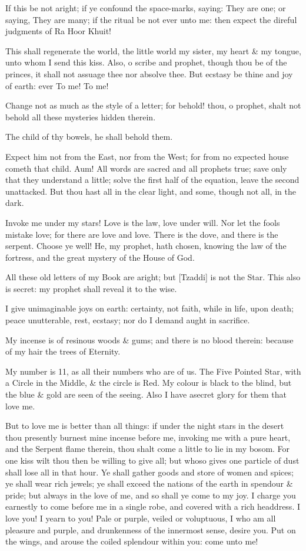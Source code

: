 If this be not aright; if ye confound the space-marks, saying: They are one; or saying, They are many; if the ritual be not ever unto me: then expect the direful judgments of Ra Hoor Khuit!

This shall regenerate the world, the little world my sister, my heart & my tongue, unto whom I send this kiss. Also, o scribe and prophet, though thou be of the princes, it shall not assuage thee nor absolve thee. But ecstasy be thine and joy of earth: ever To me! To me!

Change not as much as the style of a letter; for behold! thou, o prophet, shalt not behold all these mysteries hidden therein.

The child of thy bowels, he shall behold them.

Expect him not from the East, nor from the West; for from no expected house cometh that child. Aum! All words are sacred and all prophets true; save only that they understand a little; solve the first half of the equation, leave the second unattacked. But thou hast all in the clear light, and some, though not all, in the dark.

Invoke me under my stars! Love is the law, love under will. Nor let the fools mistake love; for there are love and love. There is the dove, and there is the serpent. Choose ye well! He, my prophet, hath chosen, knowing the law of the fortress, and the great mystery of the House of God.\par
All these old letters of my Book are aright; but [Tzaddi] is not the Star. This also is secret: my prophet shall reveal it to the wise.

I give unimaginable joys on earth: certainty, not faith, while in life, upon death; peace unutterable, rest, ecstasy; nor do I demand aught in sacrifice.

My incense is of resinous woods & gums; and there is no blood therein: because of my hair the trees of Eternity.

My number is 11, as all their numbers who are of us. The Five Pointed Star, with a Circle in the Middle, & the circle is Red. My colour is black to the blind, but the blue & gold are seen of the seeing. Also I have asecret glory for them that love me.

But to love me is better than all things: if under the night stars in the desert thou presently burnest mine incense before me, invoking me with a pure heart, and the Serpent flame therein, thou shalt come a little to lie in my bosom. For one kiss wilt thou then be willing to give all; but whoso gives one particle of dust shall lose all in that hour. Ye shall gather goods and store of women and spices; ye shall wear rich jewels; ye shall exceed the nations of the earth in spendour & pride; but always in the love of me, and so shall ye come to my joy. I charge you earnestly to come before me in a single robe, and covered with a rich headdress. I love you! I yearn to you! Pale or purple, veiled or voluptuous, I who am all pleasure and purple, and drunkenness of the innermost sense, desire you. Put on the wings, and arouse the coiled splendour within you: come unto me!

